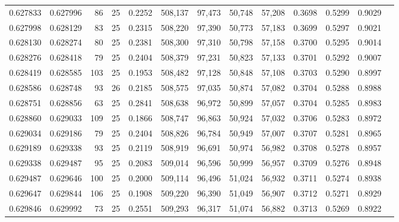 \begin{tabular}{rrrrrrrrrrrrr}
0.627833 & 0.627996 &    86 &  25 &                                     0.2252 & 508,137 &  97,473 &  50,748 &  57,208 & 0.3698 & 0.5299 & 0.9029 \\
0.627998 & 0.628129 &    83 &  25 &                                     0.2315 & 508,220 &  97,390 &  50,773 &  57,183 & 0.3699 & 0.5297 & 0.9021 \\
0.628130 & 0.628274 &    80 &  25 &                                     0.2381 & 508,300 &  97,310 &  50,798 &  57,158 & 0.3700 & 0.5295 & 0.9014 \\
0.628276 & 0.628418 &    79 &  25 &                                     0.2404 & 508,379 &  97,231 &  50,823 &  57,133 & 0.3701 & 0.5292 & 0.9007 \\
0.628419 & 0.628585 &   103 &  25 &                                     0.1953 & 508,482 &  97,128 &  50,848 &  57,108 & 0.3703 & 0.5290 & 0.8997 \\
0.628586 & 0.628748 &    93 &  26 &                                     0.2185 & 508,575 &  97,035 &  50,874 &  57,082 & 0.3704 & 0.5288 & 0.8988 \\
0.628751 & 0.628856 &    63 &  25 &                                     0.2841 & 508,638 &  96,972 &  50,899 &  57,057 & 0.3704 & 0.5285 & 0.8983 \\
0.628860 & 0.629033 &   109 &  25 &                                     0.1866 & 508,747 &  96,863 &  50,924 &  57,032 & 0.3706 & 0.5283 & 0.8972 \\
0.629034 & 0.629186 &    79 &  25 &                                     0.2404 & 508,826 &  96,784 &  50,949 &  57,007 & 0.3707 & 0.5281 & 0.8965 \\
0.629189 & 0.629338 &    93 &  25 &                                     0.2119 & 508,919 &  96,691 &  50,974 &  56,982 & 0.3708 & 0.5278 & 0.8957 \\
0.629338 & 0.629487 &    95 &  25 &                                     0.2083 & 509,014 &  96,596 &  50,999 &  56,957 & 0.3709 & 0.5276 & 0.8948 \\
0.629487 & 0.629646 &   100 &  25 &                                     0.2000 & 509,114 &  96,496 &  51,024 &  56,932 & 0.3711 & 0.5274 & 0.8938 \\
0.629647 & 0.629844 &   106 &  25 &                                     0.1908 & 509,220 &  96,390 &  51,049 &  56,907 & 0.3712 & 0.5271 & 0.8929 \\
0.629846 & 0.629992 &    73 &  25 &                                     0.2551 & 509,293 &  96,317 &  51,074 &  56,882 & 0.3713 & 0.5269 & 0.8922 \\

\end{tabular}
